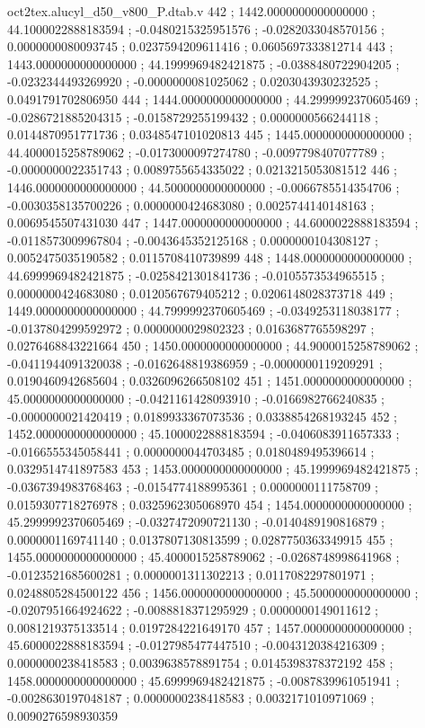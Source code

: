 \begin{filecontents}[overwrite]{oct2tex.alucyl_d50_v800_P.dtab.v}
442 ; 1442.0000000000000000 ; 44.1000022888183594 ; -0.0480215325951576 ; -0.0282033048570156 ; 0.0000000080093745 ; 0.0237594209611416 ; 0.0605697333812714
443 ; 1443.0000000000000000 ; 44.1999969482421875 ; -0.0388480722904205 ; -0.0232344493269920 ; -0.0000000081025062 ; 0.0203043930232525 ; 0.0491791702806950
444 ; 1444.0000000000000000 ; 44.2999992370605469 ; -0.0286721885204315 ; -0.0158729255199432 ; 0.0000000566244118 ; 0.0144870951771736 ; 0.0348547101020813
445 ; 1445.0000000000000000 ; 44.4000015258789062 ; -0.0173000097274780 ; -0.0097798407077789 ; -0.0000000022351743 ; 0.0089755654335022 ; 0.0213215053081512
446 ; 1446.0000000000000000 ; 44.5000000000000000 ; -0.0066785514354706 ; -0.0030358135700226 ; 0.0000000424683080 ; 0.0025744140148163 ; 0.0069545507431030
447 ; 1447.0000000000000000 ; 44.6000022888183594 ; -0.0118573009967804 ; -0.0043645352125168 ; 0.0000000104308127 ; 0.0052475035190582 ; 0.0115708410739899
448 ; 1448.0000000000000000 ; 44.6999969482421875 ; -0.0258421301841736 ; -0.0105573534965515 ; 0.0000000424683080 ; 0.0120567679405212 ; 0.0206148028373718
449 ; 1449.0000000000000000 ; 44.7999992370605469 ; -0.0349253118038177 ; -0.0137804299592972 ; 0.0000000029802323 ; 0.0163687765598297 ; 0.0276468843221664
450 ; 1450.0000000000000000 ; 44.9000015258789062 ; -0.0411944091320038 ; -0.0162648819386959 ; -0.0000000119209291 ; 0.0190460942685604 ; 0.0326096266508102
451 ; 1451.0000000000000000 ; 45.0000000000000000 ; -0.0421161428093910 ; -0.0166982766240835 ; -0.0000000021420419 ; 0.0189933367073536 ; 0.0338854268193245
452 ; 1452.0000000000000000 ; 45.1000022888183594 ; -0.0406083911657333 ; -0.0166555345058441 ; 0.0000000044703485 ; 0.0180489495396614 ; 0.0329514741897583
453 ; 1453.0000000000000000 ; 45.1999969482421875 ; -0.0367394983768463 ; -0.0154774188995361 ; 0.0000000111758709 ; 0.0159307718276978 ; 0.0325962305068970
454 ; 1454.0000000000000000 ; 45.2999992370605469 ; -0.0327472090721130 ; -0.0140489190816879 ; 0.0000001169741140 ; 0.0137807130813599 ; 0.0287750363349915
455 ; 1455.0000000000000000 ; 45.4000015258789062 ; -0.0268748998641968 ; -0.0123521685600281 ; 0.0000001311302213 ; 0.0117082297801971 ; 0.0248805284500122
456 ; 1456.0000000000000000 ; 45.5000000000000000 ; -0.0207951664924622 ; -0.0088818371295929 ; 0.0000000149011612 ; 0.0081219375133514 ; 0.0197284221649170
457 ; 1457.0000000000000000 ; 45.6000022888183594 ; -0.0127985477447510 ; -0.0043120384216309 ; 0.0000000238418583 ; 0.0039638578891754 ; 0.0145398378372192
458 ; 1458.0000000000000000 ; 45.6999969482421875 ; -0.0087839961051941 ; -0.0028630197048187 ; 0.0000000238418583 ; 0.0032171010971069 ; 0.0090276598930359

\end{filecontents}
